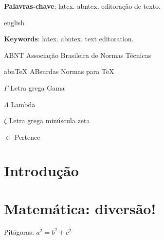 \documentclass{abntex2}
\begin{document}
\begin{agradecimentos}
\lipsum[1]
\end{agradecimentos}

\setlength{\absparsep}{18pt} %
\begin{resumo}
\lipsum[2]

 \textbf{Palavras-chave}: latex. abntex. editoração de texto.
\end{resumo}

\begin{resumo}[Abstract]
	\begin{otherlanguage*}{english}
		\lipsum[2]

		\textbf{Keywords}: latex. abntex. text editoration.
	\end{otherlanguage*}
\end{resumo}

\listoffigures*
\cleardoublepage

\listoftables*
\cleardoublepage

\begin{siglas}
  \item[ABNT] Associação Brasileira de Normas Técnicas
  \item[abnTeX] ABsurdas Normas para TeX
\end{siglas}

\begin{simbolos}
  \item[$ \Gamma $] Letra grega Gama
  \item[$ \Lambda $] Lambda
  \item[$ \zeta $] Letra grega minúscula zeta
  \item[$ \in $] Pertence
\end{simbolos}

\tableofcontents*
\cleardoublepage

\textual

\chapter{Introdução}
\lipsum[1-8]  %

\chapter{Matemática: diversão!}
Pitágoras: $a^2=b^2+c^2$
\end{document}
